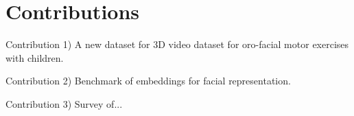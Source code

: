 \section{Contributions}

Contribution 1) A new dataset for 3D video dataset for oro-facial motor exercises with children.

Contribution 2) Benchmark of embeddings for facial representation.

Contribution 3) Survey of...



